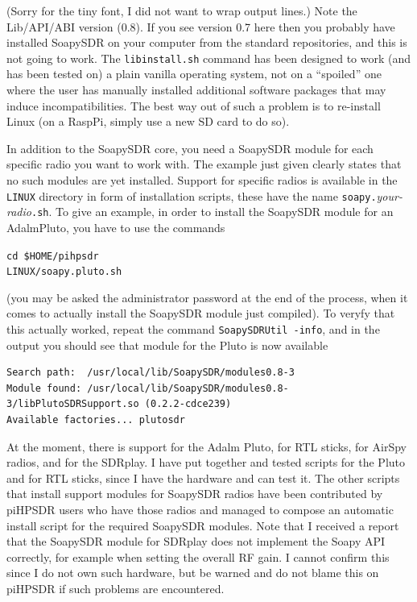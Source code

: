 \documentclass[12pt]{book}
\def\grtt#1{\texttt{\color{magenta}#1}}
\def\pH{pi\-HPSDR\xspace}
\begin{document}
(Sorry for the tiny font, I did not want to wrap output lines.)
Note the Lib/API/ABI version (0.8). If you see version 0.7 here
then you probably have installed SoapySDR on your computer
from the standard repositories, and this is not going to work.
The \texttt{libinstall.sh} command  has been designed
to work (and has been tested on) a plain vanilla operating system, not on a ``spoiled'' one
where the user has manually installed additional software packages that may induce incompatibilities.
The best way out of such a problem is to re-install Linux (on a RaspPi, simply use a new SD card to do so).

In addition to the SoapySDR core, you need a SoapySDR module for each specific radio
you want to work with. The example just given clearly states that no such modules are yet installed.
 Support for specific radios is available in the \texttt{LINUX}
directory in form of installation scripts, these have the name
 \texttt{soapy.}\textit{your-radio}\texttt{.sh}. To give an example, in order to install
 the SoapySDR module for an AdalmPluto, you have to use the commands

\grtt{cd \$HOME/pihpsdr} \\
\grtt{LINUX/soapy.pluto.sh}

(you may be asked the administrator password at the end of the process, when it comes to
actually install the SoapySDR module just compiled). To veryfy that this actually worked,
repeat the command \grtt{SoapySDRUtil -info}, and in the output you should see that module
for the Pluto is now available

\begin{scriptsize}
\begin{verbatim}
Search path:  /usr/local/lib/SoapySDR/modules0.8-3
Module found: /usr/local/lib/SoapySDR/modules0.8-3/libPlutoSDRSupport.so (0.2.2-cdce239)
Available factories... plutosdr
\end{verbatim}
\end{scriptsize}

At the moment, there is support for the Adalm Pluto, for RTL sticks, for AirSpy radios, and
for the SDRplay. I have put together and tested scripts for the Pluto and for RTL sticks,
since I have the hardware and can test it. The other scripts that install support modules
for SoapySDR radios have been contributed by \pH users who have those radios and managed
to compose an automatic install script for the required SoapySDR modules. Note that
I received a report that the SoapySDR module for SDRplay does not implement the Soapy API
correctly,
for example when setting the overall RF gain. I cannot confirm this
since I do not own such hardware, but be warned
and do not blame
this on \pH if such problems are encountered.
\end{document}
